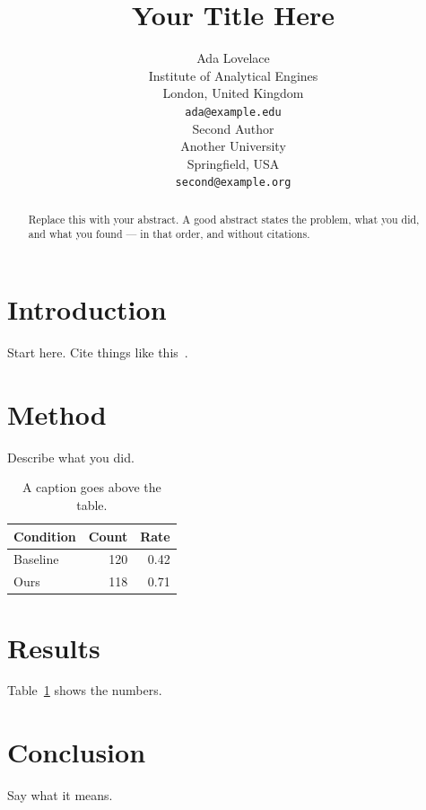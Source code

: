 \documentclass{article}
\title{Your Title Here}
\author{
  Ada Lovelace \\
  Institute of Analytical Engines\\
  London, United Kingdom \\
  \texttt{ada@example.edu} \\
  \And
  Second Author \\
  Another University\\
  Springfield, USA \\
  \texttt{second@example.org} \\
}
\begin{document}
\maketitle

\begin{abstract}
Replace this with your abstract. A good abstract states the problem, what
you did, and what you found --- in that order, and without citations.
\end{abstract}


\section{Introduction}
Start here. Cite things like this~\citep{knuth1984texbook}.

\section{Method}
\label{sec:method}
Describe what you did.

\begin{table}[htbp]
  \caption{A caption goes above the table.}
  \label{tab:example}
  \centering
  \begin{tabular}{lrr}
    \toprule
    Condition & Count & Rate \\
    \midrule
    Baseline  & 120   & 0.42 \\
    Ours      & 118   & 0.71 \\
    \bottomrule
  \end{tabular}
\end{table}

\section{Results}
Table~\ref{tab:example} shows the numbers.

\section{Conclusion}
Say what it means.



\end{document}
